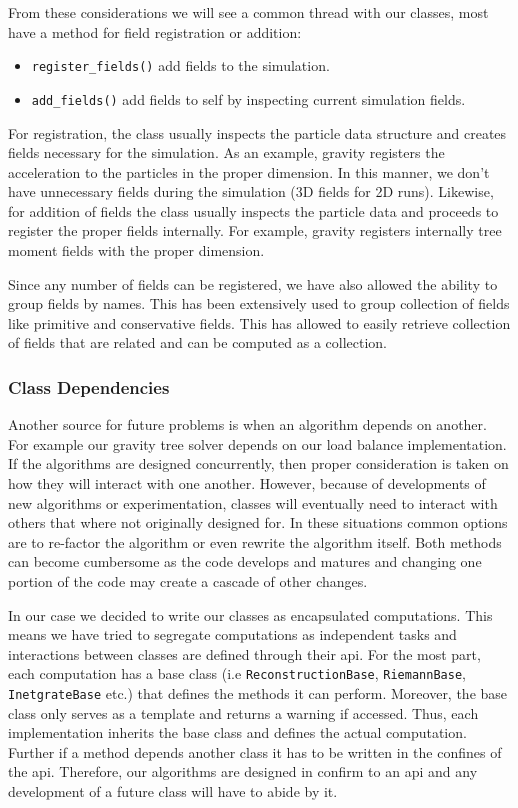 From these considerations we will see a common thread with our classes, most have a method
for field registration or addition:
\begin{itemize}
	\item \lstinline{register_fields()} add fields to the simulation.
    \item \lstinline{add_fields()} add fields to self by inspecting current simulation fields.
\end{itemize}
For registration, the class usually inspects the particle data structure and creates fields
necessary for the simulation. As an example, gravity registers the acceleration to the particles
in the proper dimension. In this manner, we don't have unnecessary fields during the simulation
(3D fields for 2D runs). Likewise, for addition of fields the class usually inspects the
particle data and proceeds to register the proper fields internally. For example, gravity 
registers internally tree moment fields with the proper dimension.

Since any number of fields can be registered, we have also allowed the ability to group
fields by names. This has been extensively used to group collection of fields like
primitive and conservative fields. This has allowed to easily retrieve collection of fields
that are related and can be computed as a collection.

\subsubsection{Class Dependencies}
Another source for future problems is when an algorithm depends on another. For example
our gravity tree solver depends on our load balance implementation. If the algorithms
are designed concurrently, then proper consideration is taken on how they will
interact with one another. However, because of developments of new algorithms or experimentation, 
classes will eventually need to interact with others that where not originally designed for. In these
situations common options are to re-factor the algorithm or even rewrite the algorithm itself. Both 
methods can become cumbersome as the code develops and matures and changing one portion of the code 
may create a cascade of other changes.

In our case we decided to write our classes as encapsulated computations. This means we have
tried to segregate computations as independent tasks and interactions between classes are 
defined through their api. For the most part, each computation has a base class (i.e 
\lstinline{ReconstructionBase}, \lstinline{RiemannBase}, \lstinline{InetgrateBase} etc.) that
defines the methods it can perform. Moreover, the base class only serves as a template and
returns a warning if accessed. Thus, each implementation inherits the base class and defines
the actual computation. Further if a method depends another class it has to be written in
the confines of the api. Therefore, our algorithms are designed in confirm to an api
and any development of a future class will have to abide by it.

